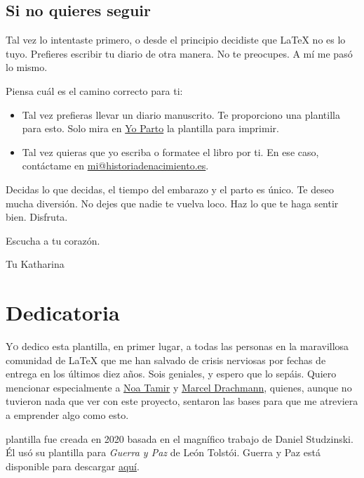 \section{Si no quieres seguir}
Tal vez lo intentaste primero, o desde el principio decidiste que \LaTeX{} no es lo tuyo. Prefieres escribir tu diario de otra manera. No te preocupes. A mí me pasó lo mismo. \newline

Piensa cuál es el camino correcto para ti:
\begin{itemize}
    \item Tal vez prefieras llevar un diario manuscrito. Te proporciono una plantilla para esto. Solo mira en \href{www.yoparto.com/diariodeembarazo}{Yo Parto} la plantilla para imprimir.
    \item Tal vez quieras que yo escriba o formatee el libro por ti. En ese caso, contáctame en \href{mailto:mi@historiadenacimiento.es}{mi@historiadenacimiento.es}.
\end{itemize}

Decidas lo que decidas, el tiempo del embarazo y el parto es único. Te deseo mucha diversión. No dejes que nadie te vuelva loco. Haz lo que te haga sentir bien. Disfruta. \newline

Escucha a tu corazón. \newline

{\LARGE{\calli Tu Katharina}}

\chapter*{Dedicatoria}

\lettrine[lines=2, loversize=0.3, lraise=0]{\initfamily Y}{o} dedico esta plantilla, en primer lugar, a todas las personas en la maravillosa comunidad de LaTeX que me han salvado de crisis nerviosas por fechas de entrega en los últimos diez años. Sois geniales, y espero que lo sepáis. Quiero mencionar especialmente a \href{http://www.noatamir.com/}{Noa Tamir} y \href{https://www.zib.de/de/members/drachmann}{Marcel Drachmann}, quienes, aunque no tuvieron nada que ver con este proyecto, sentaron las bases para que me atreviera a emprender algo como esto.

 plantilla fue creada en 2020 basada en el magnífico trabajo de Daniel Studzinski. Él usó su plantilla para \emph{Guerra y Paz} de León Tolstói. Guerra y Paz está disponible para descargar \href{https://www.overleaf.com/articles/war-and-peace/kdgcwgqzrrfd}{aquí}.

